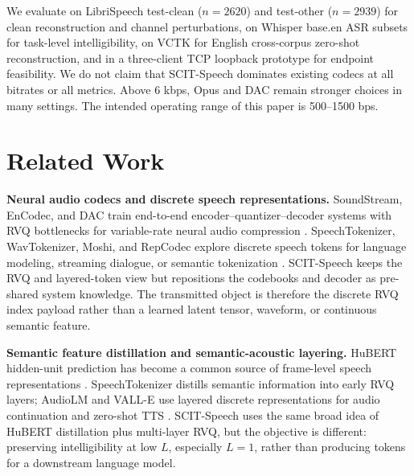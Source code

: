 ﻿\documentclass[conference]{IEEEtran}
\newcommand{\method}{SCIT-Speech}
\begin{document}
We evaluate on LibriSpeech test-clean (\(n=2620\)) and test-other (\(n=2939\)) for clean reconstruction and channel perturbations, on Whisper base.en ASR subsets for task-level intelligibility, on VCTK for English cross-corpus zero-shot reconstruction, and in a three-client TCP loopback prototype for endpoint feasibility. We do not claim that \method{} dominates existing codecs at all bitrates or all metrics. Above 6 kbps, Opus and DAC remain stronger choices in many settings. The intended operating range of this paper is 500--1500 bps.

\section{Related Work}

\textbf{Neural audio codecs and discrete speech representations.}
SoundStream, EnCodec, and DAC train end-to-end encoder--quantizer--decoder systems with RVQ bottlenecks for variable-rate neural audio compression \cite{zeghidour2021soundstream,defossez2022encodec,kumar2023dac}. SpeechTokenizer, WavTokenizer, Moshi, and RepCodec explore discrete speech tokens for language modeling, streaming dialogue, or semantic tokenization \cite{zhang2023speechtokenizer,ji2024wavtokenizer,defossez2024moshi,huang2023repcodec}. \method{} keeps the RVQ and layered-token view but repositions the codebooks and decoder as pre-shared system knowledge. The transmitted object is therefore the discrete RVQ index payload rather than a learned latent tensor, waveform, or continuous semantic feature.

\textbf{Semantic feature distillation and semantic-acoustic layering.}
HuBERT hidden-unit prediction has become a common source of frame-level speech representations \cite{hsu2021hubert}. SpeechTokenizer distills semantic information into early RVQ layers; AudioLM and VALL-E use layered discrete representations for audio continuation and zero-shot TTS \cite{zhang2023speechtokenizer,borsos2022audiolm,wang2023valle}. \method{} uses the same broad idea of HuBERT distillation plus multi-layer RVQ, but the objective is different: preserving intelligibility at low \(L\), especially \(L=1\), rather than producing tokens for a downstream language model.
\end{document}
